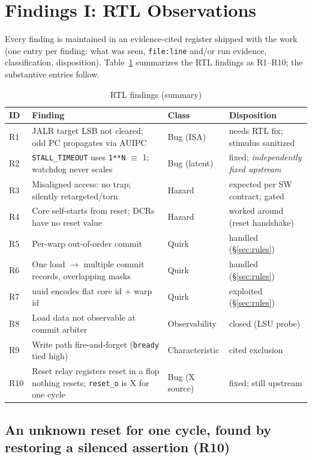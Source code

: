 \documentclass[conference]{IEEEtran}
\newcommand{\code}[1]{\texttt{\small #1}}
\begin{document}
\section{Findings I: RTL Observations}
\label{sec:rtlfindings}

Every finding is maintained in an evidence-cited register shipped with
the work (one entry per finding: what was seen, \code{file:line} and/or
run evidence, classification, disposition). Table~\ref{tab:rtlobs}
summarizes the RTL findings as R1--R10; the substantive entries follow.

\begin{table}[t]
\caption{RTL findings (summary)}
\label{tab:rtlobs}
\centering
\scriptsize
\begin{tabular}{p{0.5cm}p{3.6cm}p{1.2cm}p{1.6cm}}
\toprule
ID & Finding & Class & Disposition \\
\midrule
R1 & JALR target LSB not cleared; odd PC propagates via AUIPC & Bug (ISA) & needs RTL fix; stimulus sanitized \\
R2 & \code{STALL\_TIMEOUT} uses \code{1**N} $\equiv$ 1; watchdog never scales & Bug (latent) & fixed; \emph{independently fixed upstream} \\
R3 & Misaligned access: no trap; silently retargeted/torn & Hazard & expected per SW contract; gated \\
R4 & Core self-starts from reset; DCRs have no reset value & Hazard & worked around (reset handshake) \\
R5 & Per-warp out-of-order commit & Quirk & handled (\S\ref{sec:rules}) \\
R6 & One load $\to$ multiple commit records, overlapping masks & Quirk & handled (\S\ref{sec:rules}) \\
R7 & uuid encodes flat core id + warp id & Quirk & exploited (\S\ref{sec:rules}) \\
R8 & Load data not observable at commit arbiter & Observability & closed (LSU probe) \\
R9 & Write path fire-and-forget (\code{bready} tied high) & Characteristic & cited exclusion \\
R10 & Reset relay registers reset in a flop nothing resets; \code{reset\_o} is X for one cycle & Bug (X source) & fixed; still upstream \\
\bottomrule
\end{tabular}
\end{table}

\subsection{An unknown reset for one cycle, found by restoring a
silenced assertion (R10)}
\label{sec:r10}
\end{document}
